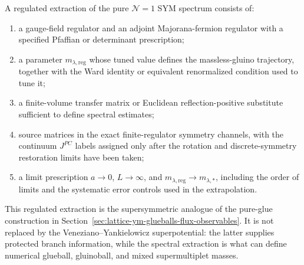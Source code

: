 \begin{definition}
\label{def:regulated-pure-sym-spectral-extraction}
A regulated extraction of the pure \(\mathcal N=1\) SYM spectrum consists of:
\begin{enumerate}[label=(\roman*)]
\item a gauge-field regulator and an adjoint Majorana-fermion regulator with
  a specified Pfaffian or determinant prescription;
\item a parameter \(m_{\lambda,\mathrm{reg}}\) whose tuned value defines the
  massless-gluino trajectory, together with the Ward identity or equivalent
  renormalized condition used to tune it;
\item a finite-volume transfer matrix or Euclidean reflection-positive
  substitute sufficient to define spectral estimates;
\item source matrices in the exact finite-regulator symmetry channels, with
  the continuum \(J^{PC}\) labels assigned only after the rotation and
  discrete-symmetry restoration limits have been taken;
\item a limit prescription \(a\to0\), \(L\to\infty\), and
  \(m_{\lambda,\mathrm{reg}}\to m_{\lambda,\ast}\), including the order of
  limits and the systematic error controls used in the extrapolation.
\end{enumerate}
This regulated extraction is the supersymmetric analogue of the pure-glue
construction in Section~\ref{sec:lattice-ym-glueballs-flux-observables}.  It
is not replaced by the Veneziano--Yankielowicz superpotential: the latter
supplies protected branch information, while the spectral extraction is what
can define numerical glueball,
gluinoball, and mixed supermultiplet masses.
\end{definition}

